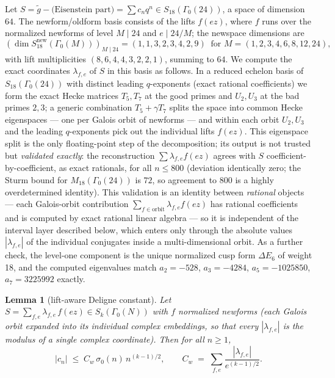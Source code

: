 \documentclass[11pt]{article}
\newtheorem{lemma}[theorem]{Lemma}
\theoremstyle{remark}
\begin{document}
Let $S=\tilde g-\text{(Eisenstein part)}=\sum c_nq^n\in
S_{18}(\Gamma_0(24))$, a space of dimension $64$. The newform/oldform
basis consists of the lifts $f(ez)$, where $f$ runs over the normalized
newforms of level $M\mid24$ and $e\mid 24/M$; the newspace dimensions
are
\[
(\dim S^{\mathrm{new}}_{18}(\Gamma_0(M)))_{M\mid24}
=(1,1,3,2,3,4,2,9)\ \text{ for }M=(1,2,3,4,6,8,12,24),
\]
with lift multiplicities $(8,6,4,4,3,2,2,1)$, summing to $64$. We
compute the exact coordinates $\lambda_{f,e}$ of $S$ in this basis as
follows. In a reduced echelon basis of $S_{18}(\Gamma_0(24))$ with
distinct leading $q$-exponents (exact rational coefficients) we form the
exact Hecke matrices $T_5,T_7$ at the good primes and $U_2,U_3$ at the
bad primes $2,3$; a generic combination $T_5+\gamma T_7$ splits the
space into common Hecke eigenspaces --- one per Galois orbit of
newforms --- and within each orbit $U_2,U_3$ and the leading
$q$-exponents pick out the individual lifts $f(ez)$. This eigenspace
split is the only floating-point step of the decomposition; its output
is not trusted but \emph{validated exactly}: the
reconstruction $\sum\lambda_{f,e}f(ez)$ agrees with $S$
coefficient-by-coefficient, as exact rationals, for all $n\le 800$
(deviation identically zero; the Sturm bound for
$M_{18}(\Gamma_0(24))$ is $72$, so agreement to $800$ is a highly
overdetermined identity). This validation is an identity between
\emph{rational} objects --- each Galois-orbit contribution
$\sum_{f\in\text{orbit}}\lambda_{f,e}f(ez)$ has rational coefficients
and is computed by exact rational linear algebra --- so it is
independent of the interval layer described below, which enters only
through the absolute values $|\lambda_{f,e}|$ of the individual
conjugates inside a multi-dimensional orbit. As a further check, the level-one component is
the unique normalized cusp form $\Delta E_6$ of weight 18, and the computed
eigenvalues match $a_2=-528$, $a_3=-4284$, $a_5=-1025850$,
$a_7=3225992$ exactly.

\begin{lemma}[lift-aware Deligne constant]\label{lem:liftaware}
Let $S=\sum_{f,e}\lambda_{f,e}\,f(ez)\in S_k(\Gamma_0(N))$ with $f$
normalized newforms (each Galois orbit expanded into its individual
complex embeddings, so that every $|\lambda_{f,e}|$ is the modulus of a
single complex coordinate). Then for all $n\ge1$,
\[
|c_n|\;\le\;C_w\,\sigma_0(n)\,n^{(k-1)/2},
\qquad
C_w\;=\;\sum_{f,e}\frac{|\lambda_{f,e}|}{e^{(k-1)/2}}.
\]
\end{lemma}
\end{document}
